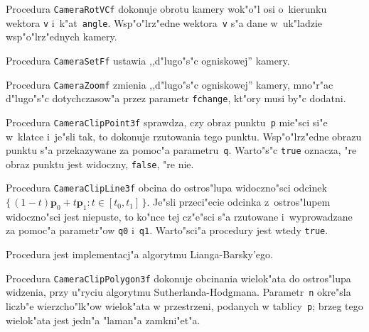 \vspace{\bigskipamount}
Procedura \texttt{CameraRotVCf} dokonuje obrotu kamery wok"o"l osi
o~kierunku wektora \texttt{v} i~k"at~\texttt{angle}. Wsp"o"lrz"edne
wektora~\texttt{v} s"a dane w~uk"ladzie wsp"o"lrz"ednych kamery.

\vspace{\bigskipamount}
Procedura \texttt{CameraSetFf} ustawia ,,d"lugo"s"c ogniskowej'' kamery.

\vspace{\bigskipamount}
Procedura \texttt{CameraZoomf} zmienia ,,d"lugo"s"c ogniskowej'' kamery,
mno"r"ac d"lugo"s"c dotychczasow"a przez parametr \texttt{fchange}, kt"ory
musi by"c dodatni.

\vspace{\bigskipamount}
Procedura \texttt{CameraClipPoint3f} sprawdza, czy obraz punktu~\texttt{p}
mie"sci si"e w~klatce i~je"sli tak, to dokonuje rzutowania tego punktu.
Wsp"o"lrz"edne obrazu punktu s"a przekazywane za pomoc"a parametru~\texttt{q}.
Warto"s"c \texttt{true} oznacza, "re obraz punktu jest widoczny, \texttt{false},
"re nie.

\vspace{\bigskipamount}
Procedura \texttt{CameraClipLine3f} obcina do ostros"lupa widoczno"sci
odcinek $\{\,(1-t)\bm{p}_0+t\bm{p}_1\colon t\in[t_0,t_1]\,\}$.
Je"sli przeci"ecie odcinka z~ostros"lupem widoczno"sci jest niepuste,
to ko"nce tej cz"e"sci s"a rzutowane i~wyprowadzane za pomoc"a parametr"ow
\texttt{q0} i~\texttt{q1}. Warto"sci"a procedury jest wtedy \texttt{true}.

Procedura jest implementacj"a algorytmu Lianga-Barsky'ego.

\vspace{\bigskipamount}
Procedura \texttt{CameraClipPolygon3f} dokonuje obcinania wielok"ata
do ostros"lupa widzenia, przy u"ryciu algorytmu Sutherlanda-Hodgmana.
Parametr~\texttt{n} okre"sla liczb"e wierzcho"lk"ow wielok"ata
w przestrzeni, podanych w tablicy~\texttt{p}; brzeg tego wielok"ata
jest jedn"a "laman"a zamkni"et"a.

